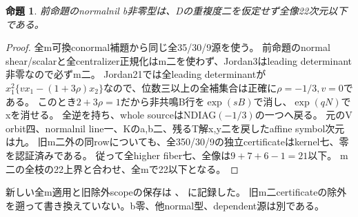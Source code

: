 \documentclass[a4paper,11pt]{ltjsarticle}
\newtheorem{proposition}{命題}[section]
\theoremstyle{definition}
\begin{document}
\begin{proposition}\label{prop:plane-global-nilpotent-nonzero-b-all-m}
前命題のnormalnil b非零型は、Dの重複度二を仮定せず全像22次元以下である。
\end{proposition}
\begin{proof}
全m可換conormal補題から同じ全35/30/9源を使う。
前命題のnormal shear/scalarと全centralizer正規化はm二を使わず、Jordan3はleading determinant非零なので必ずm二。
Jordan21では全leading determinantが
$x_1^2\{vx_1-(1+3\rho)x_2\}$なので、位数三以上の全補集合は正確に$\rho=-1/3,v=0$である。
このとき$2+3\rho=1$だから非共鳴B行を$\exp(sB)$で消し、$\exp(qN)$でxを消せる。
全逆を持ち、whole sourceはNDIAG$(-1/3)$の一つへ戻る。
元のV orbit四、normalnil line一、Kのa,b二、残るT解x,y二を戻したaffine symbol次元は九。
旧m二外の同rowについても、全350/30/9の独立certificateはkernel七、零を認証済みである。
従って全higher fiber七、全像は$9+7+6-1=21$以下。
m二の全枝の22上界と合わせ、全mで22以下となる。
\end{proof}
新しい全m適用と旧除外scopeの保存は
、
に記録した。
旧m二certificateの除外を遡って書き換えていない。b零、他normal型、dependent源は別である。
\end{document}
